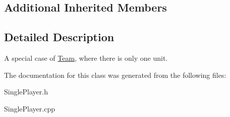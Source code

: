 \subsection*{Additional Inherited Members}


\subsection{Detailed Description}
A special case of \hyperlink{class_team}{Team}, where there is only one unit. 

The documentation for this class was generated from the following files\+:\begin{DoxyCompactItemize}
\item 
Single\+Player.\+h\item 
Single\+Player.\+cpp\end{DoxyCompactItemize}
